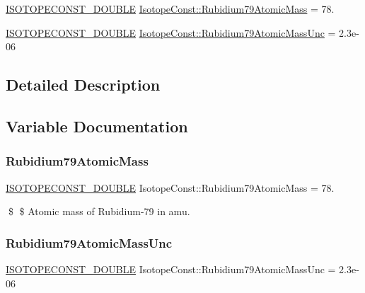 \begin{DoxyCompactItemize}
\item 
\mbox{\hyperlink{group___isotope_const-_macros_ga8f45a7272ce02c0b4c65c44636ed719a}{I\+S\+O\+T\+O\+P\+E\+C\+O\+N\+S\+T\+\_\+\+D\+O\+U\+B\+LE}} \mbox{\hyperlink{group___isotope_const-_rubidium-_rb79_ga4508c51539e912deb2a8a434616d1935}{Isotope\+Const\+::\+Rubidium79\+Atomic\+Mass}} = 78.
\item 
\mbox{\hyperlink{group___isotope_const-_macros_ga8f45a7272ce02c0b4c65c44636ed719a}{I\+S\+O\+T\+O\+P\+E\+C\+O\+N\+S\+T\+\_\+\+D\+O\+U\+B\+LE}} \mbox{\hyperlink{group___isotope_const-_rubidium-_rb79_ga50d3174982c56a8c3d0cb084fe665560}{Isotope\+Const\+::\+Rubidium79\+Atomic\+Mass\+Unc}} = 2.\+3e-\/06
\end{DoxyCompactItemize}


\subsection{Detailed Description}


\subsection{Variable Documentation}
\mbox{\label{group___isotope_const-_rubidium-_rb79_ga4508c51539e912deb2a8a434616d1935}} 
\subsubsection{\texorpdfstring{Rubidium79\+Atomic\+Mass}{Rubidium79AtomicMass}}
{\footnotesize\ttfamily \mbox{\hyperlink{group___isotope_const-_macros_ga8f45a7272ce02c0b4c65c44636ed719a}{I\+S\+O\+T\+O\+P\+E\+C\+O\+N\+S\+T\+\_\+\+D\+O\+U\+B\+LE}} Isotope\+Const\+::\+Rubidium79\+Atomic\+Mass = 78.}

\$ \$ Atomic mass of Rubidium-\/79 in amu. \mbox{\label{group___isotope_const-_rubidium-_rb79_ga50d3174982c56a8c3d0cb084fe665560}} 
\subsubsection{\texorpdfstring{Rubidium79\+Atomic\+Mass\+Unc}{Rubidium79AtomicMassUnc}}
{\footnotesize\ttfamily \mbox{\hyperlink{group___isotope_const-_macros_ga8f45a7272ce02c0b4c65c44636ed719a}{I\+S\+O\+T\+O\+P\+E\+C\+O\+N\+S\+T\+\_\+\+D\+O\+U\+B\+LE}} Isotope\+Const\+::\+Rubidium79\+Atomic\+Mass\+Unc = 2.\+3e-\/06}

